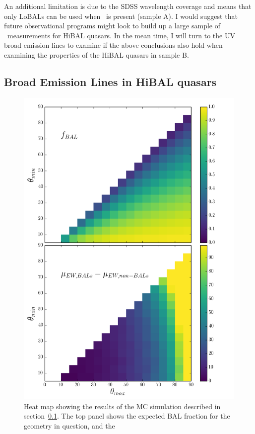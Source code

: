 An additional limitation is due to the SDSS wavelength coverage
and means that only LoBALs can be used when \ewo\ is present (sample A).
I would suggest that future observational programs might 
look to build up a large sample of \ewo\ measurements for HiBAL
quasars. In the mean time, I will turn to the UV broad emission
lines to examine if the above conclusions also hold
when examining the properties of the HiBAL quasars in sample B.

\subsection{Broad Emission Lines in HiBAL quasars}
\label{sec:hibal_v_nonbal}

\begin{figure} %
\centering
\includegraphics[width=1.0\textwidth]{figures/ewpaper/faceon_ew_c4_faceon_sdss.png}
\caption
{
Heat map showing the results of the MC simulation described in 
section~\ref{sec:hibal_v_nonbal}. The top panel shows the expected 
BAL fraction for the geometry in question, and the 
}
\label{fig:c4_faceon}
\end{figure} %

